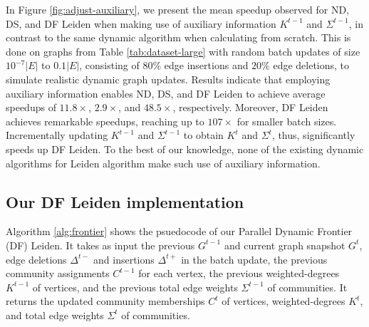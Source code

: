 In Figure \ref{fig:adjust-auxiliary}, we present the mean speedup observed for ND, DS, and DF Leiden when making use of auxiliary information $K^{t-1}$ and $\Sigma^{t-1}$, in contrast to the same dynamic algorithm when calculating from scratch. This is done on graphs from Table \ref{tab:dataset-large} with random batch updates of size $10^{-7} |E|$ to $0.1 |E|$, consisting of $80\%$ edge insertions and $20\%$ edge deletions, to simulate realistic dynamic graph updates. Results indicate that employing auxiliary information enables ND, DS, and DF Leiden to achieve average speedups of $11.8\times$, $2.9\times$, and $48.5\times$, respectively. Moreover, DF Leiden achieves remarkable speedups, reaching up to $107\times$ for smaller batch sizes. Incrementally updating $K^{t-1}$ and $\Sigma^{t-1}$ to obtain $K^t$ and $\Sigma^t$, thus, significantly speeds up DF Leiden. To the best of our knowledge, none of the existing dynamic algorithms for Leiden algorithm make such use of auxiliary information.






\subsection{Our DF Leiden implementation}
\label{sec:our-frontier}

Algorithm \ref{alg:frontier} shows the psuedocode of our Parallel Dynamic Frontier (DF) Leiden. It takes as input the previous $G^{t-1}$ and current graph snapshot $G^t$, edge deletions $\Delta^{t-}$ and insertions $\Delta^{t+}$ in the batch update, the previous community assignments $C^{t-1}$ for each vertex, the previous weighted-degrees $K^{t-1}$ of vertices, and the previous total edge weights $\Sigma^{t-1}$ of communities. It returns the updated community memberships $C^t$ of vertices, weighted-degrees $K^t$, and total edge weights $\Sigma^t$ of communities.



